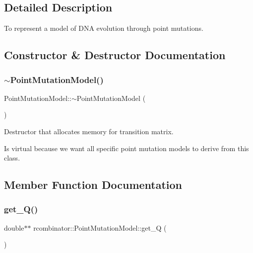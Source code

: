 \subsection{Detailed Description}
To represent a model of D\+NA evolution through point mutations. 

\subsection{Constructor \& Destructor Documentation}
\mbox{\label{classrcombinator_1_1PointMutationModel_a2ac7ebc4b6264c6597808574501e45e5}} 
\subsubsection{\texorpdfstring{$\sim$\+Point\+Mutation\+Model()}{~PointMutationModel()}}
{\footnotesize\ttfamily Point\+Mutation\+Model\+::$\sim$\+Point\+Mutation\+Model (\begin{DoxyParamCaption}{ }\end{DoxyParamCaption})\hspace{0.3cm}{\ttfamily [virtual]}}



Destructor that allocates memory for transition matrix. 

Is virtual because we want all specific point mutation models to derive from this class. 

\subsection{Member Function Documentation}
\mbox{\label{classrcombinator_1_1PointMutationModel_a43457739c51566273d471098dc2cacf0}} 
\subsubsection{\texorpdfstring{get\+\_\+\+Q()}{get\_Q()}}
{\footnotesize\ttfamily double$\ast$$\ast$ rcombinator\+::\+Point\+Mutation\+Model\+::get\+\_\+Q (\begin{DoxyParamCaption}{ }\end{DoxyParamCaption})\hspace{0.3cm}{\ttfamily [inline]}}



